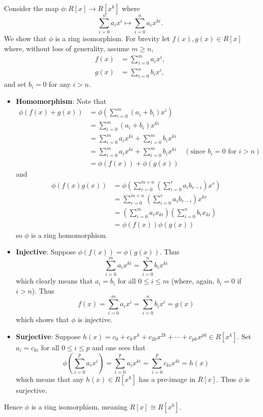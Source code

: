 \begin{questions}
    \item Consider the map $\phi: R[x] \to R[x^k]$ where
    \[
        \sum_{i=0}^n a_ix^i \mapsto \sum_{i=0}^na_ix^{ki}.
    \]
    We show that $\phi$ is a ring isomorphism. For brevity let $f(x), g(x) \in R[x]$ where, without loss of generality, assume $m \geq n$,
    \begin{align*}
        f(x) &= \sum_{i=0}^m a_ix^i,\\
        g(x) &= \sum_{i=0}^n b_ix^i,
    \end{align*}
    and set $b_i = 0$ for any $i > n$.
    \begin{itemize}
        \item \textbf{Homomorphism}: Note that
        \begin{align*}
            \phi(f(x) + g(x)) &= \phi\left(\sum_{i=0}^m(a_i+b_i)x^i\right)\\
            &= \sum_{i=0}^m(a_i+b_i)x^{ki}\\
            &= \sum_{i=0}^ma_ix^{ki} + \sum_{i=0}^mb_ix^{ki}\\
            &= \sum_{i=0}^ma_ix^{ki} + \sum_{i=0}^mb_ix^{ki} & (\text{since } b_i = 0 \text{ for } i > n)\\
            &= \phi(f(x)) + \phi(g(x))
        \end{align*}
        and
        \begin{align*}
            \phi(f(x)g(x)) &= \phi\left(\sum_{r=0}^{m+n}\left(\sum_{i=0}^ra_ib_{r-i}\right)x^r\right)\\
            &= \sum_{r=0}^{m+n}\left(\sum_{i=0}^ra_ib_{r-i}\right)x^{kr}\\
            &= \left(\sum_{i=0}^ma_ix_{ki}\right)\left(\sum_{i=0}^nb_ix_{ki}\right)\\
            &= \phi(f(x))\phi(g(x))
        \end{align*}
        so $\phi$ is a ring homomorphism.

        \item \textbf{Injective}: Suppose $\phi(f(x)) = \phi(g(x))$. Thus
        \[
            \sum_{i=0}^m a_ix^{ki} = \sum_{i=0}^n b_ix^{ki}
        \]
        which clearly means that $a_i = b_i$ for all $0 \leq i \leq m$ (where, again, $b_i = 0$ if $i > n$). Thus
        \[
            f(x) = \sum_{i=0}^m a_ix^i = \sum_{i=0}^n b_ix^i = g(x)
        \]
        which shows that $\phi$ is injective.
        
        \item \textbf{Surjective}: Suppose $h(x) = c_0 + c_kx^k + c_{2k}x^{2k} + \cdots + c_{pk}x^{pk} \in R[x^k]$. Set $a_i = c_{ki}$ for all $0 \leq i \leq p$ and one sees that
        \[
            \phi\left(\sum_{i=0}^pa_ix^i\right) = \sum_{i=0}^pa_ix^{ki} = \sum_{i=0}^pc_{ki}x^{ki} = h(x)
        \]
        which means that any $h(x) \in R[x^k]$ has a pre-image in $R[x]$. Thus $\phi$ is surjective.
    \end{itemize}
    Hence $\phi$ is a ring isomorphism, meaning $R[x] \cong R[x^k]$.
    

\end{questions}

